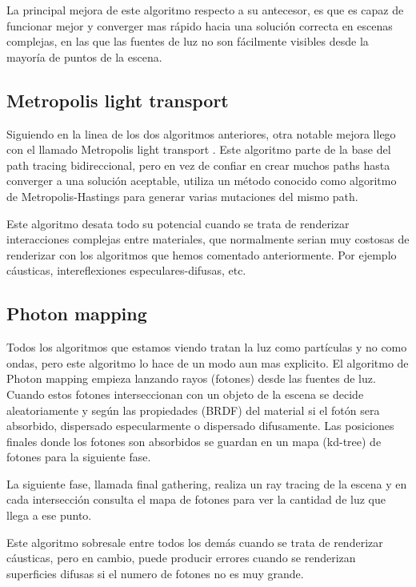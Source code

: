 \medskip
La principal mejora de este algoritmo respecto a su antecesor, es que es capaz de funcionar mejor y converger mas rápido hacia una solución correcta en escenas complejas, en las que las fuentes de luz no son fácilmente visibles desde la mayoría de puntos de la escena.

\subsection{Metropolis light transport}

Siguiendo en la linea de los dos algoritmos anteriores, otra notable mejora llego con el llamado Metropolis light transport \cite{Veach1997}. Este algoritmo parte de la base del path tracing bidireccional, pero en vez de confiar en crear muchos paths hasta converger a una solución aceptable, utiliza un método conocido como algoritmo de Metropolis-Hastings para generar varias mutaciones del mismo path. 

\medskip
Este algoritmo desata todo su potencial cuando se trata de renderizar interacciones complejas entre materiales, que normalmente serian muy costosas de renderizar con los algoritmos que hemos comentado anteriormente. Por ejemplo cáusticas, intereflexiones especulares-difusas, etc.

\clearpage

\subsection{Photon mapping}

Todos los algoritmos que estamos viendo tratan la luz como partículas y no como ondas, pero este algoritmo lo hace de un modo aun mas explicito.
El algoritmo de Photon mapping \cite{Jensen1996} empieza lanzando rayos (fotones) desde las fuentes de luz. Cuando estos fotones interseccionan con un objeto de la escena se decide aleatoriamente y según las propiedades (BRDF) del material si el fotón sera absorbido, dispersado especularmente o dispersado difusamente. Las posiciones finales donde los fotones son absorbidos se guardan en un mapa (kd-tree) de fotones para la siguiente fase.

\medskip
La siguiente fase, llamada final gathering, realiza un ray tracing de la escena y en cada intersección consulta el mapa de fotones para ver la cantidad de luz que llega a ese punto.

\medskip
Este algoritmo sobresale entre todos los demás cuando se trata de renderizar cáusticas, pero en cambio, puede producir errores cuando se renderizan superficies difusas si el numero de fotones no es muy grande.



